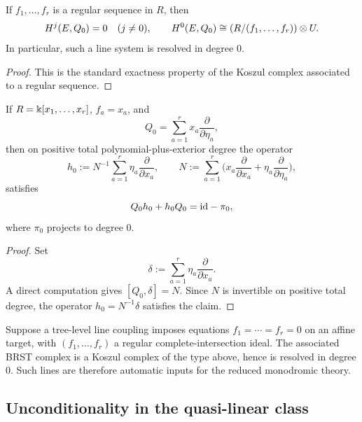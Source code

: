 \begin{proposition}\label{prop:regular-sequence}
If $f_1,\dots,f_r$ is a regular sequence in $R$, then
\[
 H^j(E,Q_0)=0\quad (j\neq 0),
 \qquad
 H^0(E,Q_0)\cong (R/(f_1,\dots,f_r))\otimes U.
\]
In particular, such a line system is resolved in degree $0$.
\end{proposition}

\begin{proof}
This is the standard exactness property of the Koszul complex associated to a regular sequence.
\end{proof}

\begin{lemma}\label{lem:linear-homotopy}
If $R=\Bbbk[x_1,\dots,x_r]$, $f_a=x_a$, and
\[
 Q_0=\sum_{a=1}^r x_a\frac{\partial}{\partial\eta_a},
\]
then on positive total polynomial-plus-exterior degree the operator
\[
 h_0 := N^{-1}\sum_{a=1}^r \eta_a\frac{\partial}{\partial x_a},
 \qquad
 N:=\sum_{a=1}^r\Big(x_a\frac{\partial}{\partial x_a}+\eta_a\frac{\partial}{\partial\eta_a}\Big),
\]
satisfies
\[
 Q_0h_0+h_0Q_0=\mathrm{id}-\pi_0,
\]
where $\pi_0$ projects to degree $0$.
\end{lemma}

\begin{proof}
Set
\[
 \delta:=\sum_{a=1}^r \eta_a\frac{\partial}{\partial x_a}.
\]
A direct computation gives $[Q_0,\delta]=N$. Since $N$ is invertible on positive total degree, the operator $h_0=N^{-1}\delta$ satisfies the claim.
\end{proof}

\begin{example}
Suppose a tree-level line coupling imposes equations $f_1=\cdots=f_r=0$ on an affine target, with $(f_1,\dots,f_r)$ a regular complete-intersection ideal. The associated BRST complex is a Koszul complex of the type above, hence is resolved in degree $0$. Such lines are therefore automatic inputs for the reduced monodromic theory.
\end{example}

\subsection{Unconditionality in the quasi-linear class}

